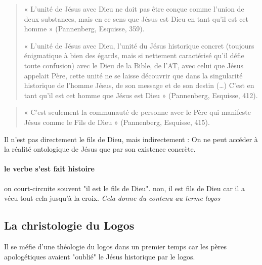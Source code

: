 \begin{quote}
    « L’unité de Jésus avec Dieu ne doit pas être conçue comme l’union de deux substances, mais
en ce sens que Jésus est Dieu en tant qu’il est cet homme » (Pannenberg, Esquisse, 359).


« L’unité de Jésus avec Dieu, l’unité du Jésus historique concret (toujours énigmatique à bien
des égards, mais si nettement caractérisé qu’il défie toute confusion) avec le Dieu de la Bible,
de l’AT, avec celui que Jésus appelait Père, cette unité ne se laisse découvrir que dans la
singularité historique de l’homme Jésus, de son message et de son destin (…) C’est en tant
qu’il est cet homme que Jésus est Dieu » (Pannenberg, Esquisse, 412).
\end{quote}

\begin{quote}
    « C’est seulement la communauté de personne avec le Père qui manifeste Jésus comme le Fils
de Dieu » (Pannenberg, Esquisse, 415).
\end{quote}
Il n'est pas directement le fils de Dieu, mais indirectement : On ne peut accéder à la réalité ontologique de Jésus que par son existence concrète. 

\paragraph{le verbe s'est fait histoire} on court-circuite souvent "il est le fils de Dieu". non, il est fils de Dieu car il a vécu tout cela jusqu'à la croix.
\textit{Cela donne du contenu au terme logos}

\subsection{La christologie du Logos}

Il se méfie d'une théologie du logos dans un premier temps car les pères apologétiques avaient "oublié" le Jésus historique par le logos.

